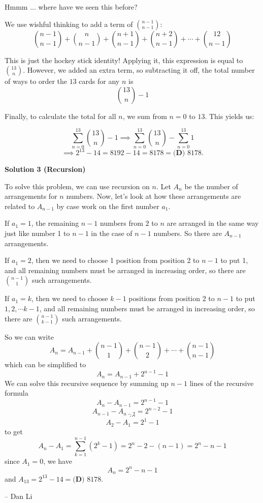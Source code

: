 \begin{enumerate}
 Hmmm ... where have we seen this before?

 We use wishful thinking to add a term of $\binom{n-1}{n-1}$:
 \[\binom{n-1}{n-1}+\binom{n}{n-1}+\binom{n+1}{n-1}+\binom{n+2}{n-1} + \cdots + \binom{12}{n-1}\]

 This is just the hockey stick identity! Applying it, this expression is equal to $\binom{13}{n}$. However, we added an extra term, so subtracting it off, the total number of ways to order the $13$ cards for any $n$ is 
 \[\binom{13}{n}-1\]

 Finally, to calculate the total for all $n$, we sum from $n=0$ to $13$. This yields us:

 
 \[\sum_{n=0}^{13} \binom{13}{n}-1 \implies \sum_{n=0}^{13} \binom{13}{n} - \sum_{n=0}^{13} 1\]
 \[\implies 2^{13} - 14 = 8192 - 14 = 8178 = \boxed{\textbf{(D) } 8178}.\]




\textbf{Solution 3 (Recursion)}

To solve this problem, we can use recursion on $n$. Let $A_n$ be the number of arrangements for $n$ numbers. Now, let's look at how these arrangements are related to $A_{n-1}$ by case work on the first number $a_1$.

 If $a_1 = 1$, the remaining $n-1$ numbers from $2$ to $n$ are arranged in the same way just like number 1 to $n-1$ in the case of $n-1$ numbers. So there are $A_{n-1}$ arrangements.

 If $a_1 = 2$, then we need to choose 1 position from position 2 to $n-1$ to put 1, and all remaining numbers must be arranged in increasing order, so there are $\binom{n-1}{1}$ such arrangements.

 If $a_1 = k$, then we need to choose $k-1$ positions from position 2 to $n-1$ to put $1, 2,\cdots k-1$, and all remaining numbers must be arranged in increasing order, so there are $\binom{n-1}{k-1}$ such arrangements.

 So we can write 
 \[A_n = A_{n-1} + \binom{n-1}{1} + \binom{n-1}{2} + \cdots + \binom{n-1}{n-1}\]which can be simplified to
 \[A_n = A_{n-1} + 2^{n-1} - 1\] We can solve this recursive sequence by summing up $n-1$ lines of the recursive formula
 \[A_n - A_{n-1} = 2^{n-1} - 1\]
 \[A_{n-1} - A_{n-2} = 2^{n-2} - 1\]
 \[\cdots\]
 \[A_2 - A_{1} = 2^{1} - 1\]to get
 \[A_n - A_1 = \sum_{k=1}^{n-1} (2^k - 1) = 2^n - 2 - (n-1) = 2^n - n - 1\]since $A_1=0$, we have
 \[A_n = 2^n - n - 1\]and $A_{13} = 2^{13} - 14 = \boxed{\textbf{(D) } 8178}$.

 
-- Dan Li


\end{enumerate}
